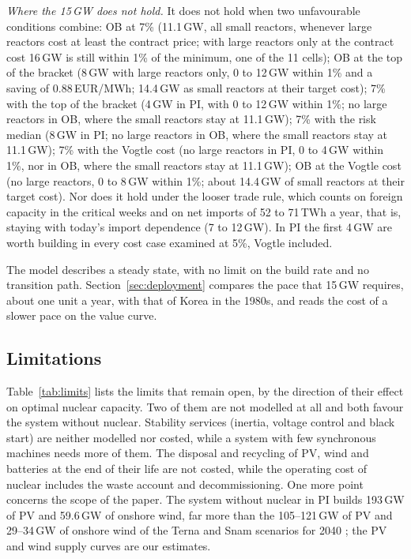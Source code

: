 \emph{Where the 15\,GW does not hold.} It does not hold when two unfavourable conditions combine: OB at 7\% (11.1\,GW, all small reactors, whenever large reactors cost at least the contract price; with large reactors only at the contract cost 16\,GW is still within 1\% of the minimum, one of the 11 cells); OB at the top of the bracket (8\,GW with large reactors only, 0 to 12\,GW within 1\% and a saving of 0.88\,EUR/MWh; 14.4\,GW as small reactors at their target cost); 7\% with the top of the bracket (4\,GW in PI, with 0 to 12\,GW within 1\%; no large reactors in OB, where the small reactors stay at 11.1\,GW); 7\% with the risk median (8\,GW in PI; no large reactors in OB, where the small reactors stay at 11.1\,GW); 7\% with the Vogtle cost (no large reactors in PI, 0 to 4\,GW within 1\%, nor in OB, where the small reactors stay at 11.1\,GW); OB at the Vogtle cost (no large reactors, 0 to 8\,GW within 1\%; about 14.4\,GW of small reactors at their target cost). Nor does it hold under the looser trade rule, which counts on foreign capacity in the critical weeks and on net imports of 52 to 71\,TWh a year, that is, staying with today's import dependence (7 to 12\,GW). In PI the first 4\,GW are worth building in every cost case examined at 5\%, Vogtle included.

The model describes a steady state, with no limit on the build rate and no transition path. Section~\ref{sec:deployment} compares the pace that 15\,GW requires, about one unit a year, with that of Korea in the 1980s, and reads the cost of a slower pace on the value curve.

\subsection{Limitations}\label{sec:limits}
Table~\ref{tab:limits} lists the limits that remain open, by the direction of their effect on optimal nuclear capacity. Two of them are not modelled at all and both favour the system without nuclear. Stability services (inertia, voltage control and black start) are neither modelled nor costed, while a system with few synchronous machines needs more of them. The disposal and recycling of PV, wind and batteries at the end of their life are not costed, while the operating cost of nuclear includes the waste account and decommissioning. One more point concerns the scope of the paper. The system without nuclear in PI builds 193\,GW of PV and 59.6\,GW of onshore wind, far more than the 105--121\,GW of PV and 29--34\,GW of onshore wind of the Terna and Snam scenarios for 2040 \citep{DDS2024}; the PV and wind supply curves are our estimates.


